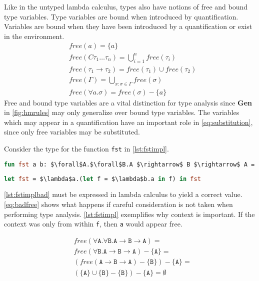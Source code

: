 \documentclass[11pt,oneside,a4paper]{report}
\begin{document}
Like in the untyped lambda calculus, types also have notions of free and bound type variables.
Type variables are bound when introduced by quantification.
Variables are bound when they have been introduced by a quantification or exist in the environment.
\begin{align}
	 & \textit{free}(a) = \{ a \}                                                              \\
	 & \textit{free}(C \tau_1 \dots \tau_n ) = \bigcup_{i = 1}^n \textit{free}(\tau_i)           \\
     & \textit{free}(\tau_1 \rightarrow \tau_2) = \textit{free}(\tau_1) \cup \textit{free}(\tau_2)          \\
	 & \textit{free}(\Gamma) = \bigcup_{x:\sigma \in \Gamma} \textit{free}(\sigma)             \\
	 & \textit{free}(\forall a . \sigma) = \textit{free}(\sigma) - \{ a \}                     
\end{align}
Free and bound type variables are a vital distinction for type analysis since \textbf{Gen} in \autoref{fig:hmrules} may only generalize over bound type variables.
The variables which may appear in a quantification have an important role in \autoref{eq:substitution}, since only free variables may be substituted.
\begin{exmp}
Consider the type for the function \texttt{fst} in \autoref{lst:fstimpl}.
\begin{lstlisting}[language=ML,caption={First function},label={lst:fstimplbad},mathescape=true]
fun fst a b: $\forall$A.$\forall$B.A $\rightarrow$ B $\rightarrow$ A = a;
\end{lstlisting}
\begin{lstlisting}[language=ML,caption={First function in lambda calculus},label={lst:fstimpl},mathescape=true]
let fst = $\lambda$a.(let f = $\lambda$b.a in f) in fst
\end{lstlisting}
\autoref{lst:fstimplbad} must be expressed in lambda calculus to yield a correct value.
\autoref{eq:badfree} shows what happens if careful consideration is not taken when performing type analysis.
\autoref{lst:fstimpl} exemplifies why context is important.
If the context was only from within \texttt{f}, then \texttt{a} would appear free.
\begin{figure}[ht]
    \begin{align}
    &\textit{free}(\forall\texttt{A}.\forall\texttt{B}.\texttt{A} \rightarrow \texttt{B} \rightarrow \texttt{A}) = \\
    &\textit{free}(\forall\texttt{B}.\texttt{A} \rightarrow \texttt{B} \rightarrow \texttt{A}) - \{ \texttt{A} \} = \\
    &(\textit{free}(\texttt{A} \rightarrow \texttt{B} \rightarrow \texttt{A}) - \{ \texttt{B} \}) - \{ \texttt{A} \} = \\
    &(\{ \texttt{A} \} \cup \{ \texttt{B} \} - \{ \texttt{B} \}) - \{ \texttt{A} \} = \emptyset
    \end{align}
    \caption{}
    \label{eq:badfree}
\end{figure}
\end{exmp}
\end{document}
